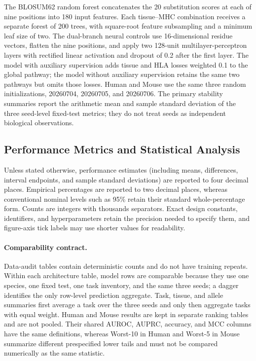 The BLOSUM62 random forest \cite{henikoff1992blosum} concatenates the 20 substitution scores at each of nine positions into 180 input features. Each tissue--MHC combination receives a separate forest of 200 trees, with square-root feature subsampling and a minimum leaf size of two. The dual-branch neural controls use 16-dimensional residue vectors, flatten the nine positions, and apply two 128-unit multilayer-perceptron layers with rectified linear activation and dropout of 0.2 after the first layer. The model with auxiliary supervision adds tissue and HLA losses weighted 0.1 to the global pathway; the model without auxiliary supervision retains the same two pathways but omits those losses. Human and Mouse use the same three random initializations, 20260704, 20260705, and 20260706. The primary stability summaries report the arithmetic mean and sample standard deviation of the three seed-level fixed-test metrics; they do not treat seeds as independent biological observations.

\subsection{Performance Metrics and Statistical Analysis}

Unless stated otherwise, performance estimates (including means, differences, interval endpoints, and sample standard deviations) are reported to four decimal places. Empirical percentages are reported to two decimal places, whereas conventional nominal levels such as 95\% retain their standard whole-percentage form. Counts are integers with thousands separators. Exact design constants, identifiers, and hyperparameters retain the precision needed to specify them, and figure-axis tick labels may use shorter values for readability.

\paragraph{Comparability contract.}
Data-audit tables contain deterministic counts and do not have training repeats. Within each architecture table, model rows are comparable because they use one species, one fixed test, one task inventory, and the same three seeds; a dagger identifies the only row-level prediction aggregate. Task, tissue, and allele summaries first average a task over the three seeds and only then aggregate tasks with equal weight. Human and Mouse results are kept in separate ranking tables and are not pooled. Their shared AUROC, AUPRC, accuracy, and MCC columns have the same definitions, whereas Worst-10 in Human and Worst-5 in Mouse summarize different prespecified lower tails and must not be compared numerically as the same statistic.

